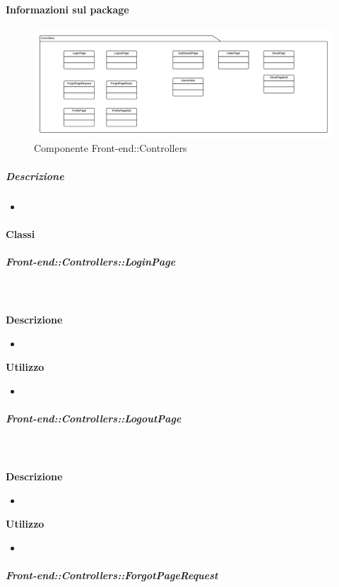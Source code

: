   \paragraph{Informazioni sul package}
    \begin{figure}[H] 
      \begin{center} 
        \includegraphics[width=\textwidth]{packages/Front-end::Controllers.png}  
        \caption{Componente Front-end::Controllers}
      \end{center}  
    \end{figure} 
  \subparagraph{Descrizione} 
    \begin{itemize}
    \item[] 
    \end{itemize} 
    \paragraph{Classi}
      \subparagraph{Front-end::Controllers::LoginPage}
        
        \textbf{\\ \\ Descrizione} 
          \begin{itemize}
            \item[] 
          \end{itemize}      
        \textbf{Utilizzo}  
          \begin{itemize}
            \item[] 
          \end{itemize}
      \subparagraph{Front-end::Controllers::LogoutPage}
        
        \textbf{\\ \\ Descrizione} 
          \begin{itemize}
            \item[] 
          \end{itemize}      
        \textbf{Utilizzo}  
          \begin{itemize}
            \item[] 
          \end{itemize}
      \subparagraph{Front-end::Controllers::ForgotPageRequest}
        
